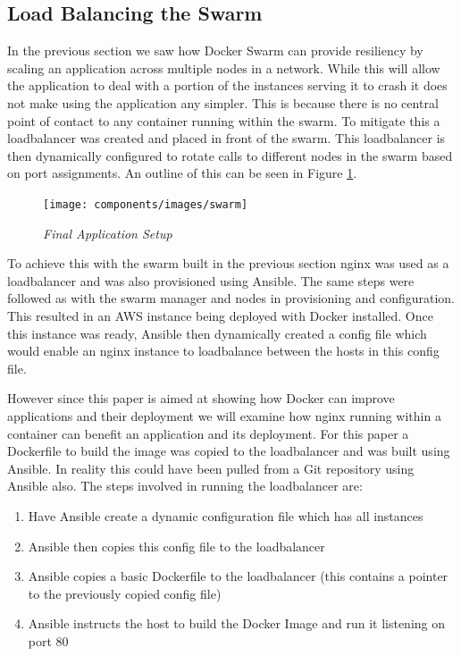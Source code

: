 \documentclass{article}
\begin{document}
\subsection{Load Balancing the Swarm}
\label{sub:single_app}
In the previous section we saw how Docker Swarm can provide resiliency by scaling an application across multiple nodes in a network. While this will allow the application to deal with a portion of the instances serving it to crash it does not make using the application any simpler. This is because there is no central point of contact to any container running within the swarm. To mitigate this a loadbalancer was created and placed in front of the swarm. This loadbalancer is then dynamically configured to rotate calls to different nodes in the swarm based on port assignments. An outline of this can be seen in Figure \ref{fig:swarm}. 

\begin{figure}[!h]
\centering
\texttt{[image: components/images/swarm]}
\caption{\em Final Application Setup}
\label{fig:swarm}
\end{figure}

To achieve this with the swarm built in the previous section nginx was used as a loadbalancer and was also provisioned using Ansible. The same steps were followed as with the swarm manager and nodes in provisioning and configuration. This resulted in an AWS instance being deployed with Docker installed. Once this instance was ready, Ansible then dynamically created a config file which would enable an nginx instance to loadbalance between the hosts in this config file. 

However since this paper is aimed at showing how Docker can improve applications and their deployment we will examine how nginx running within a container can benefit an application and its deployment. For this paper a Dockerfile to build the image was copied to the loadbalancer and was built using Ansible. In reality this could have been pulled from a Git repository using Ansible also. The steps involved in running the loadbalancer are:

\begin{enumerate}
  \item Have Ansible create a dynamic configuration file which has all instances
  \item Ansible then copies this config file to the loadbalancer
  \item Ansible copies a basic Dockerfile to the loadbalancer (this contains a pointer to the previously copied config file)
  \item Ansible instructs the host to build the Docker Image and run it listening on port 80 
\end{enumerate}
\end{document}
